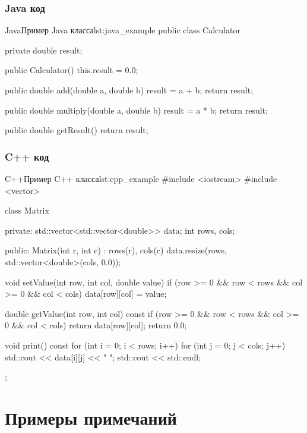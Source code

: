 \subsubsection{Java код}

\begin{CodeBlock}{Java}{Пример Java класса}{lst:java_example}
public class Calculator {
    private double result;
    
    public Calculator() {
        this.result = 0.0;
    }
    
    public double add(double a, double b) {
        result = a + b;
        return result;
    }
    
    public double multiply(double a, double b) {
        result = a * b;
        return result;
    }
    
    public double getResult() {
        return result;
    }
}
\end{CodeBlock}

\subsubsection{C++ код}

\begin{CodeBlock}{C++}{Пример C++ класса}{lst:cpp_example}
#include <iostream>
#include <vector>

class Matrix {
private:
    std::vector<std::vector<double>> data;
    int rows, cols;
    
public:
    Matrix(int r, int c) : rows(r), cols(c) {
        data.resize(rows, std::vector<double>(cols, 0.0));
    }
    
    void setValue(int row, int col, double value) {
        if (row >= 0 && row < rows && col >= 0 && col < cols) {
            data[row][col] = value;
        }
    }
    
    double getValue(int row, int col) const {
        if (row >= 0 && row < rows && col >= 0 && col < cols) {
            return data[row][col];
        }
        return 0.0;
    }
    
    void print() const {
        for (int i = 0; i < rows; i++) {
            for (int j = 0; j < cols; j++) {
                std::cout << data[i][j] << " ";
            }
            std::cout << std::endl;
        }
    }
};
\end{CodeBlock}

\section{Примеры примечаний}

